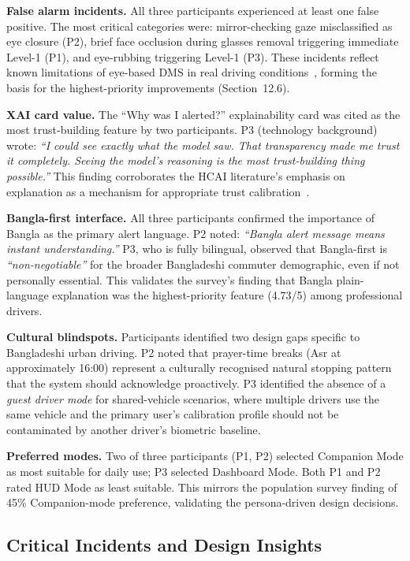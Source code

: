 \documentclass[sigconf]{acmart}
\begin{document}
\textbf{False alarm incidents.} All three participants experienced at least one false positive. The most critical categories were: mirror-checking gaze misclassified as eye closure (P2), brief face occlusion during glasses removal triggering immediate Level-1 (P1), and eye-rubbing triggering Level-1 (P3). These incidents reflect known limitations of eye-based DMS in real driving conditions~\cite{ref26, ref28}, forming the basis for the highest-priority improvements (Section~12.6).

\textbf{XAI card value.} The ``Why was I alerted?'' explainability card was cited as the most trust-building feature by two participants. P3 (technology background) wrote: \textit{``I could see exactly what the model saw. That transparency made me trust it completely. Seeing the model's reasoning is the most trust-building thing possible.''} This finding corroborates the HCAI literature's emphasis on explanation as a mechanism for appropriate trust calibration~\cite{ref14, ref23}.

\textbf{Bangla-first interface.} All three participants confirmed the importance of Bangla as the primary alert language. P2 noted: \textit{``Bangla alert message means instant understanding.''} P3, who is fully bilingual, observed that Bangla-first is \textit{``non-negotiable''} for the broader Bangladeshi commuter demographic, even if not personally essential. This validates the survey's finding that Bangla plain-language explanation was the highest-priority feature (4.73/5) among professional drivers.

\textbf{Cultural blindspots.} Participants identified two design gaps specific to Bangladeshi urban driving. P2 noted that prayer-time breaks (Asr at approximately 16:00) represent a culturally recognised natural stopping pattern that the system should acknowledge proactively. P3 identified the absence of a \textit{guest driver mode} for shared-vehicle scenarios, where multiple drivers use the same vehicle and the primary user's calibration profile should not be contaminated by another driver's biometric baseline.

\textbf{Preferred modes.} Two of three participants (P1, P2) selected Companion Mode as most suitable for daily use; P3 selected Dashboard Mode. Both P1 and P2 rated HUD Mode as least suitable. This mirrors the population survey finding of 45\% Companion-mode preference, validating the persona-driven design decisions.

\subsection{Critical Incidents and Design Insights}
\end{document}
